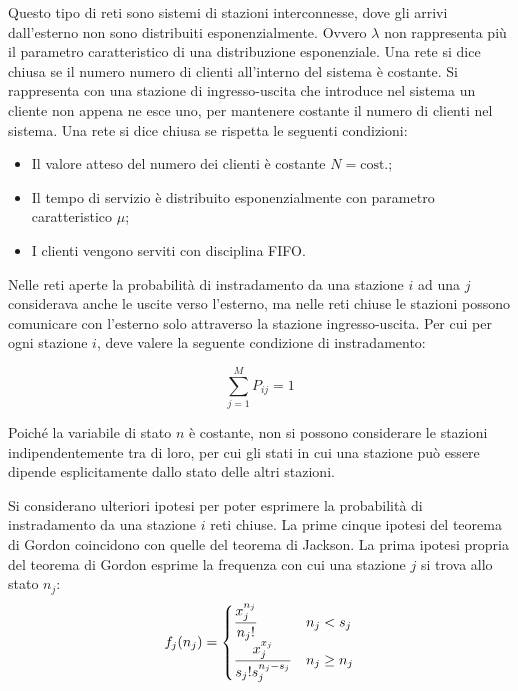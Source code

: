 \documentclass{article}
\numberwithin{equation}{subsection}
\begin{document}
Questo tipo di reti sono sistemi di stazioni interconnesse, dove gli arrivi dall'esterno non sono distribuiti esponenzialmente. Ovvero $\lambda$ 
non rappresenta più il parametro caratteristico di una distribuzione esponenziale. 
Una rete si dice chiusa se il numero numero di clienti all'interno del sistema è costante. Si rappresenta con una stazione di ingresso-uscita che 
introduce nel sistema un cliente non appena ne esce uno, per mantenere costante il numero di clienti nel sistema. 
Una rete si dice chiusa se rispetta le seguenti condizioni:
\begin{itemize}
    \item Il valore atteso del numero dei clienti è costante $N=\mathrm{cost.}$;
    \item Il tempo di servizio è distribuito esponenzialmente con parametro caratteristico $\mu$;
    \item I clienti vengono serviti con disciplina FIFO. 
\end{itemize}

Nelle reti aperte la probabilità di instradamento da una stazione $i$ ad una $j$ considerava anche le uscite verso l'esterno, ma nelle reti chiuse 
le stazioni possono comunicare con l'esterno solo attraverso la stazione ingresso-uscita. Per cui per ogni stazione $i$, deve valere la seguente 
condizione di instradamento:

\begin{equation}
    \displaystyle\sum_{j=1}^MP_{ij}=1
\end{equation}

Poiché la variabile di stato $n$ è costante, non si possono considerare le stazioni indipendentemente tra di loro, per cui gli stati in cui una 
stazione può essere dipende esplicitamente dallo stato delle altri stazioni. 

Si considerano ulteriori ipotesi per poter esprimere la probabilità di instradamento da una stazione $i$ reti chiuse. 
La prime cinque ipotesi del teorema di Gordon coincidono con quelle del teorema di Jackson. La prima ipotesi propria del teorema di Gordon esprime 
la frequenza con cui una stazione $j$ si trova allo stato $n_j$:
\begin{gather}
    f_j(n_j)=\begin{cases}
        \displaystyle\frac{\strut x_j^{n_j}}{\strut n_j!}&n_j<s_j\\
        \displaystyle\frac{\strut x_j^{x_j}}{\strut s_j!s_j^{n_j-s_j}}&n_j\geq n_j
    \end{cases}
\end{gather}
\end{document}
